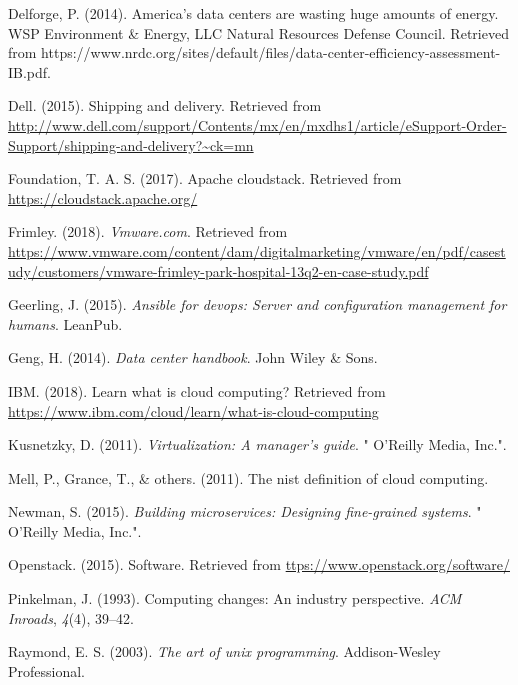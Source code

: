 \documentclass[12pt,twoside]{reedthesis}
\theoremstyle{definition}
\theoremstyle{definition}
\theoremstyle{definition}
\theoremstyle{remark}
\begin{document}
\leavevmode\hypertarget{ref-Cap1_2_PdP}{}%
Delforge, P. (2014). America's data centers are wasting huge amounts of
energy. WSP Environment \& Energy, LLC Natural Resources Defense
Council. Retrieved from
https://www.nrdc.org/sites/default/files/data-center-efficiency-assessment-IB.pdf.

\leavevmode\hypertarget{ref-Cap1_3_PdP}{}%
Dell. (2015). Shipping and delivery. Retrieved from
\url{http://www.dell.com/support/Contents/mx/en/mxdhs1/article/eSupport-Order-Support/shipping-and-delivery?~ck=mn}

\leavevmode\hypertarget{ref-Cap3_5_mT}{}%
Foundation, T. A. S. (2017). Apache cloudstack. Retrieved from
\url{https://cloudstack.apache.org/}

\leavevmode\hypertarget{ref-Cap1_Hospital}{}%
Frimley. (2018). \emph{Vmware.com}. Retrieved from
\url{https://www.vmware.com/content/dam/digitalmarketing/vmware/en/pdf/casestudy/customers/vmware-frimley-park-hospital-13q2-en-case-study.pdf}

\leavevmode\hypertarget{ref-Cap3_8mT}{}%
Geerling, J. (2015). \emph{Ansible for devops: Server and configuration
management for humans}. LeanPub.

\leavevmode\hypertarget{ref-Cap1_5_PdP}{}%
Geng, H. (2014). \emph{Data center handbook}. John Wiley \& Sons.

\leavevmode\hypertarget{ref-ibmcloud}{}%
IBM. (2018). Learn what is cloud computing? Retrieved from
\url{https://www.ibm.com/cloud/learn/what-is-cloud-computing}

\leavevmode\hypertarget{ref-Cap3_1_mT}{}%
Kusnetzky, D. (2011). \emph{Virtualization: A manager's guide}. "
O'Reilly Media, Inc.".

\leavevmode\hypertarget{ref-Cap3_3_mT}{}%
Mell, P., Grance, T., \& others. (2011). The nist definition of cloud
computing.

\leavevmode\hypertarget{ref-Cap3_Microservicios}{}%
Newman, S. (2015). \emph{Building microservices: Designing fine-grained
systems}. " O'Reilly Media, Inc.".

\leavevmode\hypertarget{ref-Cap3_4_mT}{}%
Openstack. (2015). Software. Retrieved from
\url{ttps://www.openstack.org/software/}

\leavevmode\hypertarget{ref-Cap1_ACMInroads}{}%
Pinkelman, J. (1993). Computing changes: An industry perspective.
\emph{ACM Inroads}, \emph{4}(4), 39--42.

\leavevmode\hypertarget{ref-Cap3_ArtOfLinux}{}%
Raymond, E. S. (2003). \emph{The art of unix programming}.
Addison-Wesley Professional.
\end{document}
